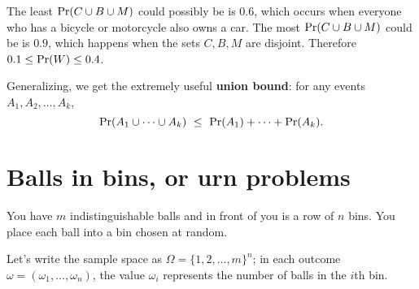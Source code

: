 The least $\mbox{\rm Pr}(C \cup B \cup M)$ could possibly be is $0.6$, which occurs when everyone who has a bicycle or motorcycle also owns a car. The most $\mbox{\rm Pr}(C \cup B \cup M)$ could be is $0.9$, which happens when the sets $C,B,M$ are disjoint. Therefore $0.1 \leq \mbox{\rm Pr}(W) \leq 0.4$.
 
Generalizing, we get the extremely useful {\bf union bound}: for any events $A_1, A_2, \ldots, A_k$,
$$ \pr(A_1 \cup \cdots \cup A_k) \ \leq \ \pr(A_1) + \cdots + \pr(A_k) .$$

\section{Balls in bins, or urn problems}

You have $m$ indistinguishable balls and in front of you is a row of $n$ bins. You place each ball into a bin chosen at random.

Let's write the sample space as $\Omega = \{1,2,\ldots, m\}^n$; in each outcome $\omega = (\omega_1, \ldots, \omega_n)$, the value $\omega_i$ represents the number of balls in the $i$th bin.

